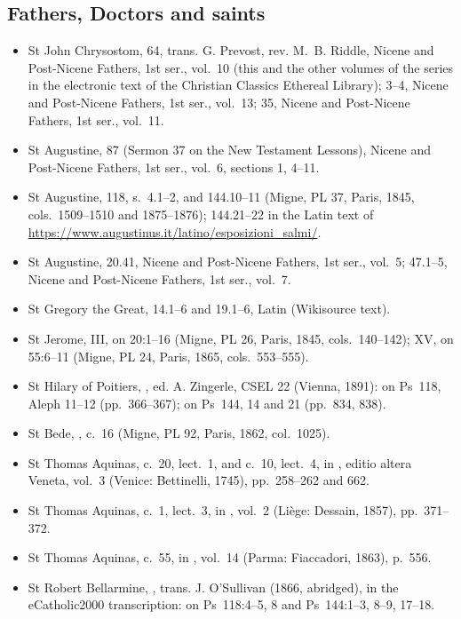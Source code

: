 {\subsection*{Fathers, Doctors and saints}
\begin{itemize}[itemsep=0pt,topsep=.25em]
\item St John Chrysostom,  64, trans. G. Prevost, rev. M.~B. Riddle, Nicene and Post-Nicene Fathers, 1st ser., vol.~10 (this and the other volumes of the series in the electronic text of the Christian Classics Ethereal Library);  3--4, Nicene and Post-Nicene Fathers, 1st ser., vol.~13;  35, Nicene and Post-Nicene Fathers, 1st ser., vol.~11.
\item St Augustine,  87 (Sermon 37 on the New Testament Lessons), Nicene and Post-Nicene Fathers, 1st ser., vol.~6, sections 1, 4--11.
\item St Augustine,  118, s.~4.1--2, and 144.10--11 (Migne, PL 37, Paris, 1845, cols.~1509--1510 and 1875--1876); 144.21--22 in the Latin text of \url{https://www.augustinus.it/latino/esposizioni_salmi/}.
\item St Augustine,  20.41, Nicene and Post-Nicene Fathers, 1st ser., vol.~5;  47.1--5, Nicene and Post-Nicene Fathers, 1st ser., vol.~7.
\item St Gregory the Great,  14.1--6 and 19.1--6, Latin (Wikisource text).
\item St Jerome,  III, on 20:1--16 (Migne, PL 26, Paris, 1845, cols.~140--142);  XV, on 55:6--11 (Migne, PL 24, Paris, 1865, cols.~553--555).
\item St Hilary of Poitiers, , ed. A. Zingerle, CSEL 22 (Vienna, 1891): on Ps~118, Aleph 11--12 (pp.~366--367); on Ps~144, 14 and 21 (pp.~834, 838).
\item St Bede, , c.~16 (Migne, PL 92, Paris, 1862, col.~1025).
\item St Thomas Aquinas,  c.~20, lect.~1, and  c.~10, lect.~4, in , editio altera Veneta, vol.~3 (Venice: Bettinelli, 1745), pp.~258--262 and 662.
\item St Thomas Aquinas,  c.~1, lect.~3, in , vol.~2 (Li\`ege: Dessain, 1857), pp.~371--372.
\item St Thomas Aquinas,  c.~55, in , vol.~14 (Parma: Fiaccadori, 1863), p.~556.
\item St Robert Bellarmine, , trans. J. O'Sullivan (1866, abridged), in the eCatholic2000 transcription: on Ps~118:4--5, 8 and Ps~144:1--3, 8--9, 17--18.
\end{itemize}

}

